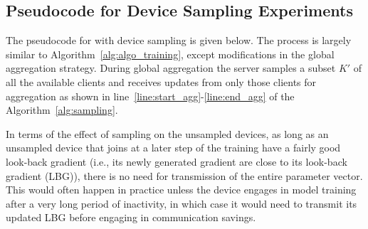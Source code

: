 \clearpage
\subsection{Pseudocode for Device Sampling Experiments}
\label{ssec:sampling_algo}

The pseudocode for {\algName} with device sampling is given below. The process is largely similar to Algorithm~\ref{alg:algo_training}, except modifications in the global aggregation strategy. During global aggregation the server samples a subset $K'$ of all the available clients and receives updates from only those clients for aggregation as shown in line~\ref{line:start_agg}-\ref{line:end_agg} of the Algorithm~\ref{alg:sampling}.

In terms of the effect of sampling on the unsampled devices, as long as an unsampled device that joins at a later step of the training have a fairly good look-back gradient (i.e., its newly generated gradient are close to its look-back gradient (LBG)), there is no need for transmission of the entire parameter vector. This would often happen in practice unless the device engages in model training after a very long period of inactivity, in which case it would need to transmit its updated LBG before engaging in {\algName} communication savings.

